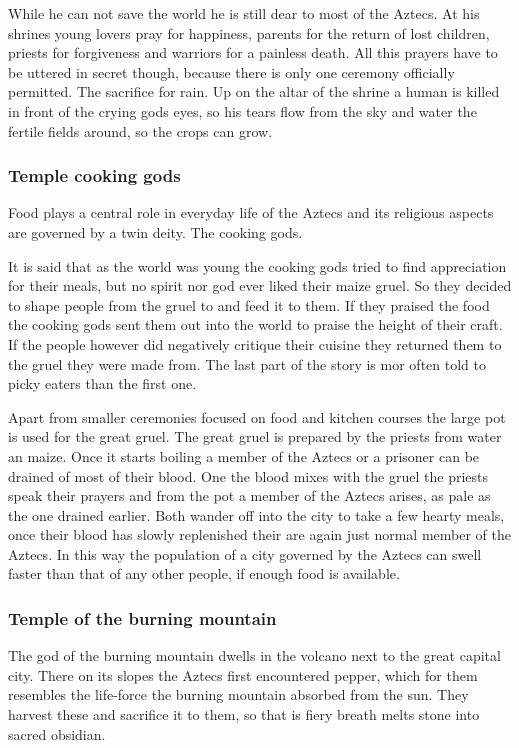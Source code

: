 While he can not save the world he is still dear to most of the \gls{Aztecs}.
At his shrines young lovers pray for happiness, parents for the return of lost
children, priests for forgiveness and warriors for a painless death. All this
prayers have to be uttered in secret though, because there is only one ceremony
officially permitted. The sacrifice for rain. Up on the altar of the shrine a
human is killed in front of the crying gods eyes, so his tears flow from the
sky and water the fertile fields around, so the crops can grow.

\subsubsection{Temple cooking gods}
Food plays a central role in everyday life of the \gls{Aztecs} and its
religious aspects are governed by a twin deity. The cooking gods.

It is said that as the world was young the cooking gods tried to find
appreciation for their meals, but no spirit nor god ever liked their maize
gruel. So they decided to shape people from the gruel to and feed it to them.
If they praised the food the cooking gods sent them out into the world to
praise the height of their craft. If the people however did negatively critique
their cuisine they returned them to the gruel they were made from. The last
part of the story is mor often told to picky eaters than the first one.

Apart from smaller ceremonies focused on food and kitchen courses the large pot
is used for the great gruel. The great gruel is prepared by the priests from
water an maize. Once it starts boiling a member of the \gls{Aztecs} or a
prisoner can be drained of most of their blood. One the blood mixes with the
gruel the priests speak their prayers and from the pot a member of the
\gls{Aztecs} arises, as pale as the one drained earlier. Both wander off into
the city to take a few hearty meals, once their blood has slowly replenished
their are again just normal member of the \gls{Aztecs}. In this way the
population of a city governed by the \gls{Aztecs} can swell faster than that of
any other people, if enough food is available.

\subsubsection{Temple of the burning mountain}
The god of the burning mountain dwells in the volcano next to the great capital
city. There on its slopes the \gls{Aztecs} first encountered pepper, which for
them resembles the life-force the burning mountain absorbed from the sun. They
harvest these and sacrifice it to them, so that is fiery breath melts stone
into sacred obsidian.

